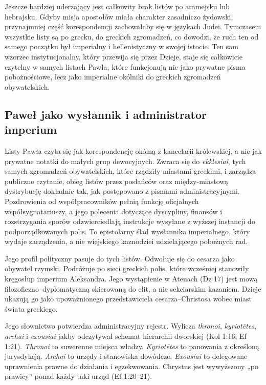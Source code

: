 Jeszcze bardziej uderzający jest całkowity brak listów po aramejsku lub hebrajsku.
Gdyby misja apostołów miała charakter zasadniczo żydowski, przynajmniej część korespondencji zachowałaby się w językach Judei.
Tymczasem wszystkie listy są po grecku, do greckich zgromadzeń, co dowodzi, że ruch ten od samego początku był imperialny i hellenistyczny w swojej istocie.
Ten sam wzorzec instytucjonalny, który przewija się przez Dzieje, staje się całkowicie czytelny w samych listach Pawła, które funkcjonują nie jako prywatne pisma pobożnościowe, lecz jako imperialne okólniki do greckich zgromadzeń obywatelskich.

\subsection{Paweł jako wysłannik i administrator imperium}\label{subsec:pauls-letters-as-state-correspondence.}

Listy Pawła czyta się jak korespondencję okólną z kancelarii królewskiej, a nie jak prywatne notatki do małych grup dewocyjnych.
Zwraca się do \textit{ekklesiai}, tych samych zgromadzeń obywatelskich, które rządziły miastami greckimi, i zarządza publiczne czytanie, obieg listów przez posłańców oraz między-miastową dystrybucję dokładnie tak, jak postępowano z pismami administracyjnymi.
Pozdrowienia od współpracowników pełnią funkcję oficjalnych współsygnatariuszy, a jego polecenia dotyczące dyscypliny, finansów i rozstrzygania sporów odzwierciedlają instrukcje wysyłane z wyższej instancji do podporządkowanych polis.
To epistolarny ślad wysłannika imperialnego, który wydaje zarządzenia, a nie wiejskiego kaznodziei udzielającego pobożnych rad.

Jego profil polityczny pasuje do tych listów.
Odwołuje się do cesarza jako obywatel rzymski.
Podróżuje po sieci greckich polis, które wcześniej stanowiły kręgosłup imperium Aleksandra.
Jego wystąpienie w Atenach (Dz 17) jest mową filozoficzno–dyplomatyczną skierowaną do elit, a nie sekciarskim kazaniem.
Dzieje ukazują go jako upoważnionego przedstawiciela cesarza–Christosa wobec miast świata greckiego.

Jego słownictwo potwierdza administracyjny rejestr.
Wylicza \textit{thronoi}, \textit{kyriotētes}, \textit{archai} i \textit{exousiai} jakby odczytywał schemat hierarchii dworskiej (Kol 1:16; Ef 1:21).
\textit{Thronoi} to suwerenne miejsca władzy.
\textit{Kyriotētes} to panowania z określoną jurysdykcją.
\textit{Archai} to urzędy i stanowiska dowódcze.
\textit{Exousiai} to delegowane uprawnienia prawne do działania i egzekwowania.
Chrystus jest wywyższony „po prawicy” ponad każdy taki urząd (Ef 1:20–21).

